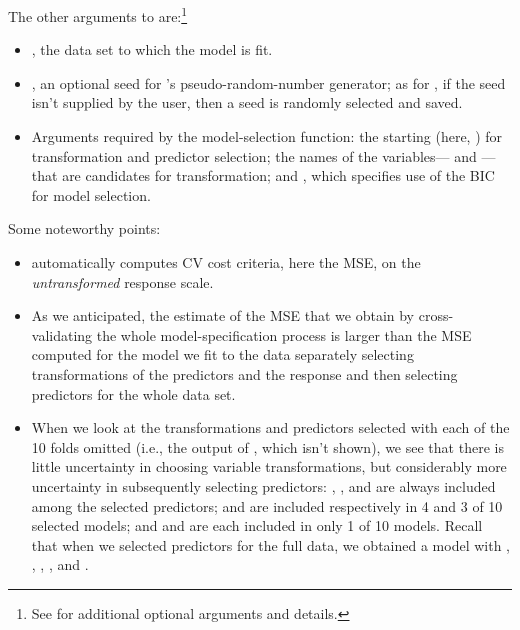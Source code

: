 \documentclass[
]{jss}
\providecommand{\tightlist}{%
  \setlength{\itemsep}{0pt}\setlength{\parskip}{0pt}}
\begin{document}
The other arguments to  are:\footnote{See 
  for additional optional arguments and details.}

\begin{itemize}
\tightlist
\item
  , the data set to which the model is fit.
\item
  , an optional seed for 's pseudo-random-number
  generator; as for , if the seed isn't supplied by the user,
  then a seed is randomly selected and saved.
\item
  Arguments required by the model-selection function: the starting
   (here, ) for transformation and
  predictor selection; the names of the variables---
  and ---that are candidates for transformation; and
  , which specifies use of the BIC for model
  selection.
\end{itemize}

Some noteworthy points:

\begin{itemize}
\tightlist
\item
   automatically computes CV cost criteria,
  here the MSE, on the \emph{untransformed} response scale.
\item
  As we anticipated, the estimate of the MSE that we obtain by
  cross-validating the whole model-specification process is larger than
  the MSE computed for the model we fit to the  data
  separately selecting transformations of the predictors and the
  response and then selecting predictors for the whole data set.
\item
  When we look at the transformations and predictors selected with each
  of the 10 folds omitted (i.e., the output of ,
  which isn't shown), we see that there is little uncertainty in
  choosing variable transformations, but considerably more uncertainty
  in subsequently selecting predictors: ,
  , and  are always included among the selected
  predictors;  and  are included
  respectively in 4 and 3 of 10 selected models; and 
  and  are each included in only 1 of 10 models. Recall
  that when we selected predictors for the full data, we obtained a
  model with , , ,
  , and .
\end{itemize}
\end{document}
